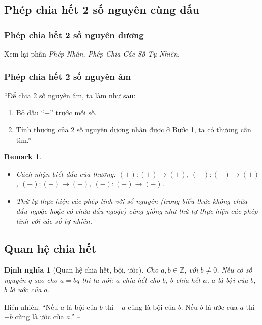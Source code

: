 \documentclass[oneside]{book}
\numberwithin{equation}{section}
\newtheorem{dinhnghia}{Định nghĩa}[section]
\newtheorem{remark}{Remark}[section]
\begin{document}
\subsection{Phép chia hết 2 số nguyên cùng dấu}

\subsubsection{Phép chia hết 2 số nguyên dương}
Xem lại phần \textit{Phép Nhân, Phép Chia Các Số Tự Nhiên}.

\subsubsection{Phép chia hết 2 số nguyên âm}
``Để chia 2 số nguyên âm, ta làm như sau:
\begin{enumerate}
	\item Bỏ dấu ``$-$'' trước mỗi số.
	\item Tính thương của 2 số nguyên dương nhận được ở Bước 1, ta có thương cần tìm.'' -- \cite[p. 85]{Thai_Anh_Dat_Ha_Loan_Nam_Quang_Toan_6_tap_1}
\end{enumerate}

\begin{remark}
	\begin{itemize}
		\item Cách nhận biết dấu của thương: $(+):(+)\to(+)$, $(-):(-)\to(+)$, $(+):(-)\to(-)$, $(-):(+)\to(-)$.
		\item Thứ tự thực hiện các phép tính với số nguyên (trong biểu thức không chứa dấu ngoặc hoặc có chứa dấu ngoặc) cũng giống như thứ tự thực hiện các phép tính với các số tự nhiên.
	\end{itemize}
\end{remark}

\subsection{Quan hệ chia hết}

\begin{dinhnghia}[Quan hệ chia hết, bội, ước]
	Cho $a,b\in\mathbb{Z}$, với $b\ne 0$. Nếu có số nguyên $q$ sao cho $a = bq$ thì ta nói: $a$ \emph{chia hết cho} $b$, $b$ \emph{chia hết} $a$, $a$ là \emph{bội} của $b$, $b$ là \emph{ước} của $a$.
\end{dinhnghia}
Hiển nhiên: ``Nếu $a$ là bội của $b$ thì $-a$ cũng là bội của $b$. Nếu $b$ là ước của $a$ thì $-b$ cũng là ước của $a$.'' -- \cite[p. 86]{Thai_Anh_Dat_Ha_Loan_Nam_Quang_Toan_6_tap_1}
\end{document}
